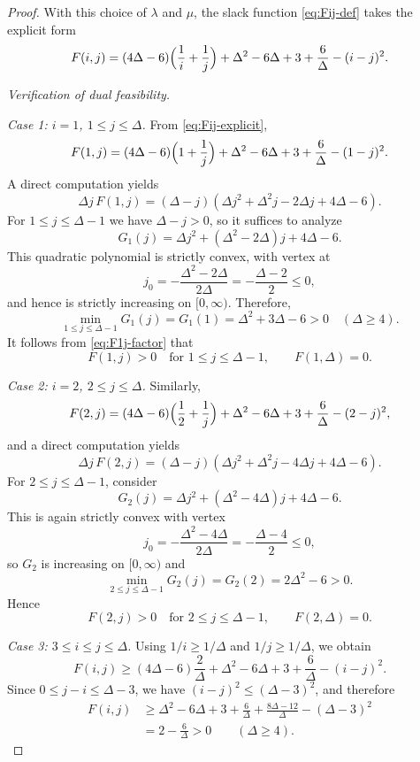 \documentclass[preprint,12pt]{elsarticle}
\begin{document}
\begin{proof}
With this choice of $\lambda$ and $\mu$, the slack function
\eqref{eq:Fij-def} takes the explicit form
\begin{equation}
\label{eq:Fij-explicit}
F(i,j)
=
(4\Delta-6)\Bigl(\frac{1}{i}+\frac{1}{j}\Bigr)
+ \Delta^2 - 6\Delta + 3 + \frac{6}{\Delta}
- (i-j)^2.
\end{equation}

\medskip\noindent
\emph{Verification of dual feasibility.}

\smallskip\noindent
\emph{Case 1: $i=1$, $1\le j\le \Delta$.}
From \eqref{eq:Fij-explicit},
\[
F(1,j)
=
(4\Delta-6)\Bigl(1+\frac{1}{j}\Bigr)
+ \Delta^2 - 6\Delta + 3 + \frac{6}{\Delta}
- (1-j)^2.
\]
A direct computation yields
\begin{equation}
\label{eq:F1j-factor}
\Delta j\,F(1,j)
=
(\Delta-j)
\left(
\Delta j^2 + \Delta^2 j - 2\Delta j + 4\Delta - 6
\right).
\end{equation}
For $1\le j\le \Delta-1$ we have $\Delta-j>0$, so it suffices to analyze
\[
G_1(j)
=
\Delta j^2 + (\Delta^2-2\Delta)j + 4\Delta - 6.
\]
This quadratic polynomial is strictly convex, with vertex at
\[
j_0=-\frac{\Delta^2-2\Delta}{2\Delta}=-\frac{\Delta-2}{2}\le 0,
\]
and hence is strictly increasing on $[0,\infty)$. Therefore,
\[
\min_{1\le j\le \Delta-1} G_1(j)=G_1(1)=\Delta^2+3\Delta-6>0
\quad(\Delta\ge 4).
\]
It follows from \eqref{eq:F1j-factor} that
\[
F(1,j)>0 \quad\text{for }1\le j\le \Delta-1,
\qquad
F(1,\Delta)=0.
\]

\smallskip\noindent
\emph{Case 2: $i=2$, $2\le j\le \Delta$.}
Similarly,
\[
F(2,j)
=
(4\Delta-6)\Bigl(\frac12+\frac{1}{j}\Bigr)
+ \Delta^2 - 6\Delta + 3 + \frac{6}{\Delta}
- (2-j)^2,
\]
and a direct computation yields
\begin{equation}
\label{eq:F2j-factor}
\Delta j\,F(2,j)
=
(\Delta-j)
\left(
\Delta j^2 + \Delta^2 j - 4\Delta j + 4\Delta - 6
\right).
\end{equation}
For $2\le j\le \Delta-1$, consider
\[
G_2(j)
=
\Delta j^2 + (\Delta^2-4\Delta)j + 4\Delta - 6.
\]
This is again strictly convex with vertex
\[
j_0=-\frac{\Delta^2-4\Delta}{2\Delta}=-\frac{\Delta-4}{2}\le 0,
\]
so $G_2$ is increasing on $[0,\infty)$ and
\[
\min_{2\le j\le \Delta-1} G_2(j)=G_2(2)=2\Delta^2-6>0.
\]
Hence
\[
F(2,j)>0 \quad\text{for }2\le j\le \Delta-1,
\qquad
F(2,\Delta)=0.
\]

\smallskip\noindent
\emph{Case 3: $3\le i\le j\le \Delta$.}
Using $1/i\ge 1/\Delta$ and $1/j\ge 1/\Delta$, we obtain
\[
F(i,j)
\ge
(4\Delta-6)\frac{2}{\Delta}
+ \Delta^2 - 6\Delta + 3 + \frac{6}{\Delta}
- (i-j)^2.
\]
Since $0\le j-i\le \Delta-3$, we have $(i-j)^2\le (\Delta-3)^2$, and therefore
\begin{align*}
F(i,j)
&\ge
\Delta^2 - 6\Delta + 3 + \frac{6}{\Delta}
+ \frac{8\Delta-12}{\Delta}
- (\Delta-3)^2\\
&=
2-\frac{6}{\Delta}>0
\qquad(\Delta\ge 4).
\end{align*}


\end{proof}
\end{document}
